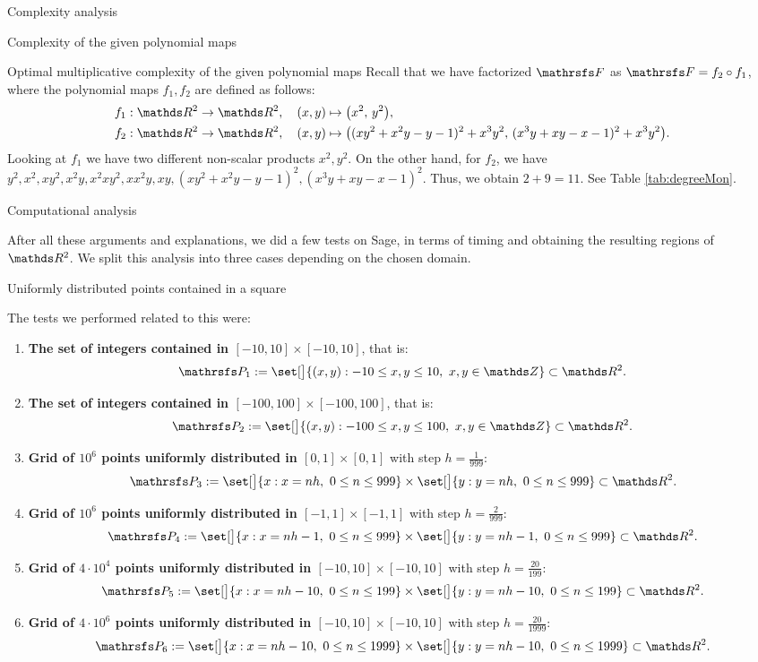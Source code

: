 \documentclass[11pt, a4paper, english, twoside, notitlepage, openright]{report}
\begin{document}
\begin{chapter}{Complexity analysis}
\begin{section}{Complexity of the given polynomial maps}
\begin{subsection}{Optimal multiplicative complexity of the given polynomial maps}
Recall that we have factorized $\FFF$ as $\FFF=f_2\circ f_1$, where the polynomial maps $f_1, f_2$ are defined as follows:
\begin{align*}
&f_1:\R^2\to\R^2,\quad (x,y)\mapsto\big(x^2,\,y^2\big),\\
&f_2:\R^2\to\R^2,\quad (x,y)\mapsto\big((xy^2+x^2y-y-1)^2+x^3y^2,\,(x^3y+xy-x-1)^2+x^3y^2\big).
\end{align*}
Looking at $f_1$ we have two different non-scalar products $x^2,y^2$. On the other hand, for $f_2$, we have $y^2,x^2,xy^2,x^2y,x^2xy^2,xx^2y,xy,(xy^2+x^2y-y-1)^2,(x^3y+xy-x-1)^2$. Thus, we obtain $2+9=11$. See Table \ref{tab:degreeMon}.

\end{subsection}

\end{section}

\begin{section}{Computational analysis}\label{5sect3}

After all these arguments and explanations, we did a few tests on Sage, in terms of timing and obtaining the resulting regions of $\R^2$. We split this analysis into three cases depending on the chosen domain.

\begin{subsection}{Uniformly distributed points contained in a square}

The tests we performed related to this were:
\begin{enumerate}[1. ]
\item \textbf{The set of integers contained in $[-10,10]\times[-10,10]$}, that is:
$$
\PP_1 := \set[\big]{(x,y):-10\le x,y\le 10,\ x, y\in \Z}\subset\R^2.
$$
\item \textbf{The set of integers contained in $[-100,100]\times[-100,100]$}, that is:
$$
\PP_2 := \set[\big]{(x,y):-100\le x,y\le 100,\ x,y\in\Z}\subset\R^2.
$$
\item \textbf{Grid of $10^6$ points uniformly distributed in $[0, 1]\times[0,1]$} with step $h=\tfrac{1}{999}$:
$$
\PP_3 := \set[\big]{x: x = nh,\ 0\le n\le 999 } \times \set[\big]{y: y=nh,\ 0\le n\le 999 } \subset \R^2.
$$
\item \textbf{Grid of $10^6$ points uniformly distributed in $[-1, 1]\times[-1,1]$} with step $h=\tfrac{2}{999}$:
$$
\PP_4 := \set[\big]{x: x = nh -1,\ 0\le n\le 999 } \times \set[\big]{y: y=nh-1,\ 0\le n\le 999 } \subset \R^2.
$$
\item \textbf{Grid of $4\cdot 10^4$ points uniformly distributed in $[-10, 10]\times[-10,10]$} with step $h=\tfrac{20}{199}$:
$$
\PP_5:=\set[\big]{x:x=nh -10,\ 0\le n\le 199 }\times\set[\big]{y: y=nh-10,\ 0\le n\le199 }\subset\R^2.
$$
\item \textbf{Grid of $4\cdot 10^6$ points uniformly distributed in $[-10, 10]\times[-10,10]$} with step $h=\tfrac{20}{1999}$:
$$
\PP_6:=\set[\big]{x:x=nh -10,\ 0\le n\le 1999 }\times\set[\big]{y:y=nh-10,\ 0\le n\le 1999 }\subset\R^2.
$$
\end{enumerate}


\end{subsection}
\end{section}
\end{chapter}
\end{document}
